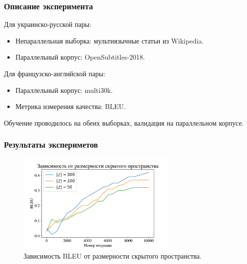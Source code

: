 \documentclass[10pt,pdf,hyperref={unicode}]{beamer}
\begin{document}
\begin{frame}
	\frametitle{Описание эксперимента}
	Для украинско-русской пары:
	\begin{itemize}
		
		\item Непараллельная выборка: мультиязычные статьи из Wikipedia.
		
		\item Параллельный корпус: OpenSubtitles-2018.
		
	\end{itemize}
	
	Для французско-английской пары:
	
	\begin{itemize}
		\item Параллельный корпус: multi30k.
		
		
		\item Метрика измерения качества: BLEU.
		
	\end{itemize} 
	
	Обучение проводилось на обеих выборках, валидация на параллельном корпусе.
	
\end{frame}

\begin{frame}
	\frametitle{Результаты экспериметов}
	
	\begin{figure}[h]
		\centering
		\includegraphics[width=0.7\textwidth]{hidden}
		\caption{Зависимость BLEU от размерности скрытого пространства.}
	\end{figure}
	
\end{frame}
\end{document}
